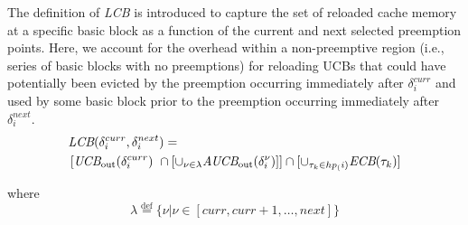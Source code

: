 The definition of \textit{LCB} is introduced to capture the set of reloaded cache memory at a specific basic block as a function of the current and next selected preemption points.  Here, we account for the overhead within a non-preemptive region (i.e., series of basic blocks with no preemptions) for reloading UCBs that could have potentially been evicted by the preemption occurring immediately after $\delta_i^{curr}$ and used by some basic block prior to the preemption occurring immediately after $\delta_i^{next}$.
\begin{equation}\label{eqn:lcb-formula-1}
\begin{split}
    \lefteqn{\textit{LCB}(\delta_{i}^{curr},\delta_{i}^{next}) =} & \\
    &\left[\textit{UCB}_{\textrm{out}}(\delta_{i}^{curr})\ \cap \left[\cup_{\nu \in \lambda} \textit{AUCB}_{\textrm{out}}(\delta_{i}^{\nu})\right]\right] \cap [\cup_{\tau_{k}\in hp_(i)} \textit{ECB}(\tau_{k})]\\
\end{split}
\end{equation}

\noindent
where
\begin{equation*}\label{eqn:lcb-formula-1b}
    \lambda \stackrel{\text{def}}{=} \{ \nu|\nu \in [ \textit{curr}, \textit{curr}+1, \ldots, \textit{next} ] \}
\end{equation*}

